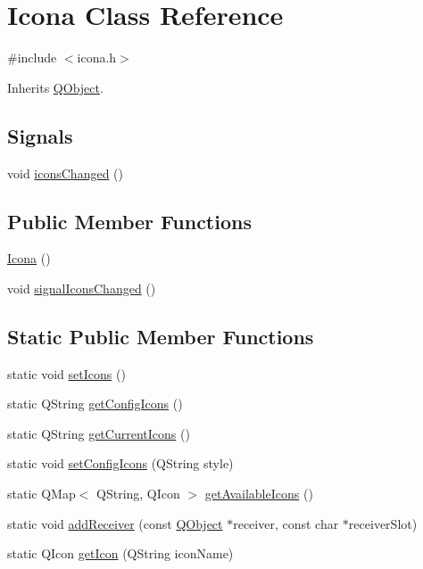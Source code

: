 \hypertarget{class_icona}{}\section{Icona Class Reference}
\label{class_icona}


{\ttfamily \#include $<$icona.\+h$>$}



Inherits \hyperlink{class_q_object}{Q\+Object}.

\subsection*{Signals}
\begin{DoxyCompactItemize}
\item 
void \hyperlink{class_icona_a7d453db3be57d034fd4dd30693c4da1d}{icons\+Changed} ()
\end{DoxyCompactItemize}
\subsection*{Public Member Functions}
\begin{DoxyCompactItemize}
\item 
\hyperlink{class_icona_a6ce64144ca7885216580c1d2fcddc0c3}{Icona} ()
\item 
void \hyperlink{class_icona_aa80aec655400cc363ed1ea8fdfe2f03b}{signal\+Icons\+Changed} ()
\end{DoxyCompactItemize}
\subsection*{Static Public Member Functions}
\begin{DoxyCompactItemize}
\item 
static void \hyperlink{class_icona_a2d806999980c80a21650300ff5e36cae}{set\+Icons} ()
\item 
static Q\+String \hyperlink{class_icona_ae4fcde6f20d15fa255ab246ef0caaaec}{get\+Config\+Icons} ()
\item 
static Q\+String \hyperlink{class_icona_aa9554f8b52200401215d0b62bcbb5adf}{get\+Current\+Icons} ()
\item 
static void \hyperlink{class_icona_aafa35f8f5c8262888c5f3ac1daf966d7}{set\+Config\+Icons} (Q\+String style)
\item 
static Q\+Map$<$ Q\+String, Q\+Icon $>$ \hyperlink{class_icona_acebd1ee76a058fb832d38c6caac701ba}{get\+Available\+Icons} ()
\item 
static void \hyperlink{class_icona_a32ca2ca763567d2b1d92dd80e441e321}{add\+Receiver} (const \hyperlink{class_q_object}{Q\+Object} $\ast$receiver, const char $\ast$receiver\+Slot)
\item 
static Q\+Icon \hyperlink{class_icona_acfd62908e0e3b548926d246b9ef3c84c}{get\+Icon} (Q\+String icon\+Name)
\end{DoxyCompactItemize}


